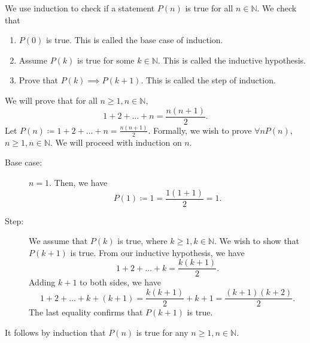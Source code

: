 \documentclass[a4paper]{article}
\begin{document}
We use induction to check if a statement \( P(n) \) is true for all \( n \in \mathbb{N} \). We check that 
\begin{enumerate}
	\item \( P(0) \) is true. This is called the base case of induction.
	\item Assume \( P(k) \) is true for some \( k \in \mathbb{N} \). This is called the inductive hypothesis.
	\item Prove that \( P(k) \implies P(k+1) \). This is called the step of induction.
\end{enumerate}

\begin{eg}
	We will prove that for all \( n \ge 1, n \in \mathbb{N} \), \[
		1 + 2 + \ldots + n = \frac{n(n+1)}{2}
	.\] Let \( P(n) \coloneq 1 + 2 + \ldots  + n = \frac{n(n+1)}{2}\). Formally, we wish to prove \( \forall n P(n) \), \( n \ge 1, n \in \mathbb{N} \). We will proceed with induction on \( n \).
	\begin{description}
		\item[Base case:] \( n = 1 \). Then, we have \[
			P(1) \coloneq 1 = \frac{1(1+1)}{2} = 1
		.\]
		\item[Step:] We assume that \( P(k) \) is true, where \( k \ge 1, k \in \mathbb{N} \). We wish to show that \( P(k+1) \) is true. From our inductive hypothesis, we have \[
			1 + 2 + \ldots + k = \frac{k(k+1)}{2}
		.\] Adding \( k + 1 \) to both sides, we have \[
			1 + 2 + \ldots + k + (k+1) = \frac{k(k+1)}{2} + k + 1 = \frac{(k+1)(k+2)}{2}
		.\] The last equality confirms that \( P(k+1) \) is true.
	\end{description}
	It follows by induction that \( P(n) \) is true for any \( n \ge 1, n \in \mathbb{N} \).
\end{eg}
\end{document}
